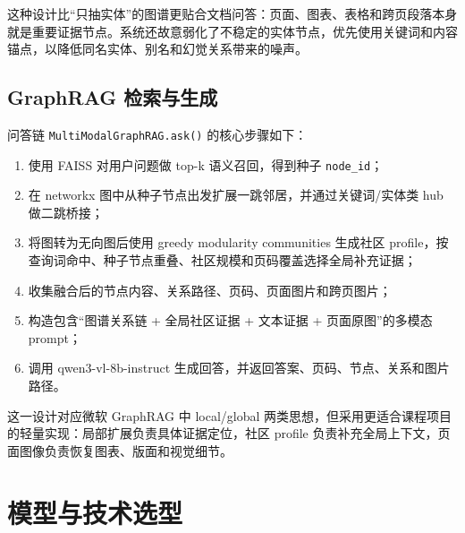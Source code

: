 这种设计比``只抽实体''的图谱更贴合文档问答：页面、图表、表格和跨页段落本身就是重要证据节点。系统还故意弱化了不稳定的实体节点，优先使用关键词和内容锚点，以降低同名实体、别名和幻觉关系带来的噪声。

\section{GraphRAG 检索与生成}\label{graphrag-ux68c0ux7d22ux4e0eux751fux6210}

问答链 \texttt{MultiModalGraphRAG.ask()} 的核心步骤如下：

\begin{enumerate}
\def\labelenumi{\arabic{enumi}.}
\tightlist
\item
  使用 FAISS 对用户问题做 top-k 语义召回，得到种子 \texttt{node\_id}；
\item
  在 networkx 图中从种子节点出发扩展一跳邻居，并通过关键词/实体类 hub
  做二跳桥接；
\item
  将图转为无向图后使用 greedy modularity communities 生成社区
  profile，按查询词命中、种子节点重叠、社区规模和页码覆盖选择全局补充证据；
\item
  收集融合后的节点内容、关系路径、页码、页面图片和跨页图片；
\item
  构造包含``图谱关系链 + 全局社区证据 + 文本证据 + 页面原图''的多模态
  prompt；
\item
  调用 qwen3-vl-8b-instruct
  生成回答，并返回答案、页码、节点、关系和图片路径。
\end{enumerate}

这一设计对应微软 GraphRAG 中 local/global
两类思想，但采用更适合课程项目的轻量实现：局部扩展负责具体证据定位，社区
profile 负责补充全局上下文，页面图像负责恢复图表、版面和视觉细节。

\chapter{模型与技术选型}\label{ux56dbux6a21ux578bux4e0eux6280ux672fux9009ux578b}

